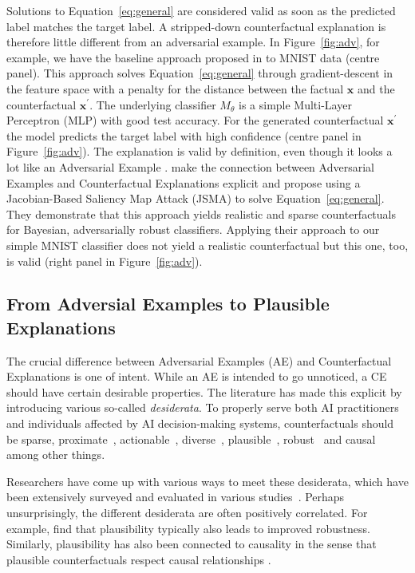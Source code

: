 \documentclass{article}
\begin{document}
Solutions to Equation~\ref{eq:general} are considered valid as soon as the predicted label matches the target label. A stripped-down counterfactual explanation is therefore little different from an adversarial example. In Figure~\ref{fig:adv}, for example, we have the baseline approach proposed in \citet{wachter2017counterfactual} to MNIST data (centre panel). This approach solves Equation~\ref{eq:general} through gradient-descent in the feature space with a penalty for the distance between the factual $\mathbf{x}$ and the counterfactual $\mathbf{x}^{\prime}$. The underlying classifier $M_{\theta}$ is a simple Multi-Layer Perceptron (MLP) with good test accuracy. For the generated counterfactual $\mathbf{x}^{\prime}$ the model predicts the target label with high confidence (centre panel in Figure~\ref{fig:adv}). The explanation is valid by definition, even though it looks a lot like an Adversarial Example \citep{goodfellow2014explaining}. \citet{schut2021generating} make the connection between Adversarial Examples and Counterfactual Explanations explicit and propose using a Jacobian-Based Saliency Map Attack (JSMA) to solve Equation~\ref{eq:general}. They demonstrate that this approach yields realistic and sparse counterfactuals for Bayesian, adversarially robust classifiers. Applying their approach to our simple MNIST classifier does not yield a realistic counterfactual but this one, too, is valid (right panel in Figure~\ref{fig:adv}). 

\subsection{From Adversial Examples to Plausible Explanations}

The crucial difference between Adversarial Examples (AE) and Counterfactual Explanations is one of intent. While an AE is intended to go unnoticed, a CE should have certain desirable properties. The literature has made this explicit by introducing various so-called \textit{desiderata}. To properly serve both AI practitioners and individuals affected by AI decision-making systems, counterfactuals should be sparse, proximate~\citep{wachter2017counterfactual}, actionable~\citep{ustun2019actionable}, diverse~\citep{mothilal2020explaining}, plausible~\citep{joshi2019realistic,poyiadzi2020face,schut2021generating}, robust~\citep{upadhyay2021robust,pawelczyk2022probabilistically,altmeyer2023endogenous} and causal~\citep{karimi2021algorithmic} among other things. 

Researchers have come up with various ways to meet these desiderata, which have been extensively surveyed and evaluated in various studies~\citep{verma2020counterfactual,karimi2020survey,pawelczyk2021carla,artelt2021evaluating,guidotti2022counterfactual}. Perhaps unsurprisingly, the different desiderata are often positively correlated. For example, \citet{artelt2021evaluating} find that plausibility typically also leads to improved robustness. Similarly, plausibility has also been connected to causality in the sense that plausible counterfactuals respect causal relationships \citep{mahajan2020preserving}. 
\end{document}
